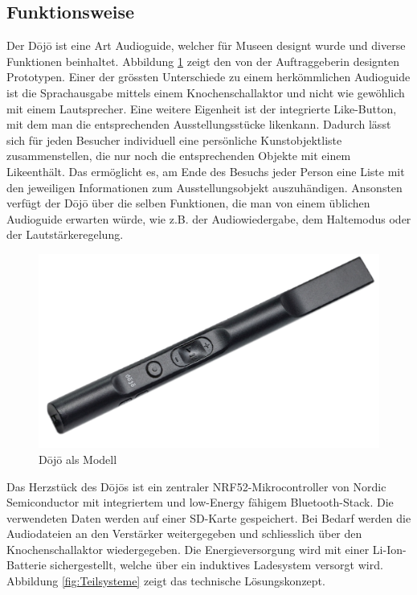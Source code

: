 \subsection{Funktionsweise} \label{sec:funktionsweise}
Der Dōjō ist eine Art Audioguide, welcher für Museen designt wurde und diverse Funktionen beinhaltet. Abbildung \ref{fig:Funktion Dojo} zeigt den von der Auftraggeberin designten Prototypen. Einer der grössten Unterschiede zu einem herkömmlichen Audioguide ist die Sprachausgabe mittels einem Knochenschallaktor und nicht wie gewöhlich mit einem Lautsprecher. Eine weitere Eigenheit ist der integrierte \glqq Like\grqq-Button, mit dem man die entsprechenden Ausstellungsstücke \glqq liken\grqq kann. Dadurch lässt sich für jeden Besucher individuell eine persönliche Kunstobjektliste zusammenstellen, die nur noch die entsprechenden Objekte mit einem \glqq Like\grqq enthält. Das ermöglicht es, am Ende des Besuchs jeder Person eine Liste mit den jeweiligen Informationen zum Ausstellungsobjekt auszuhändigen. Ansonsten verfügt der Dōjō über die selben Funktionen, die man von einem üblichen Audioguide erwarten würde, wie z.B. der Audiowiedergabe, dem Haltemodus oder der Lautstärkeregelung.

\begin{figure}[H]
	\begin{center}
		\includegraphics[width=120mm]{data/Dojo.png}
		\caption[Dōjō als Modell]{Dōjō als Modell} %
		\label{fig:Funktion Dojo}
	\end{center}
\end{figure}

Das Herzstück des Dōjōs ist ein zentraler NRF52-Mikrocontroller von Nordic Semiconductor mit integriertem und low-Energy fähigem Bluetooth-Stack. Die verwendeten Daten werden auf einer SD-Karte gespeichert. Bei Bedarf werden die Audiodateien an den Verstärker weitergegeben und schliesslich über den Knochenschallaktor wiedergegeben. Die Energieversorgung wird mit einer Li-Ion-Batterie sichergestellt, welche über ein induktives Ladesystem versorgt wird. Abbildung \ref{fig:Teilsysteme} zeigt das technische Lösungskonzept.


